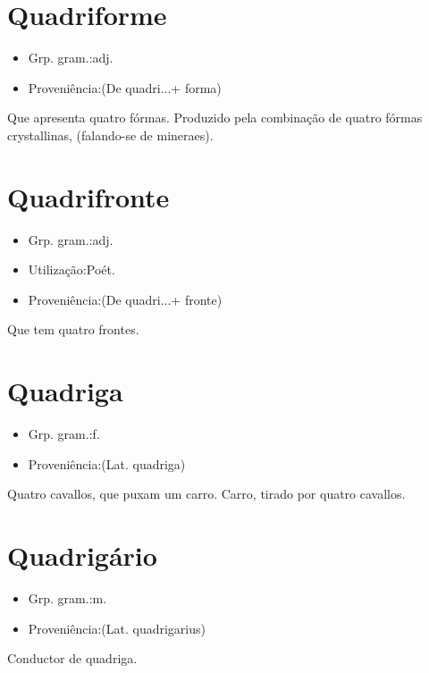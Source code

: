 \section{Quadriforme}
\begin{itemize}
\item {Grp. gram.:adj.}
\end{itemize}
\begin{itemize}
\item {Proveniência:(De \textunderscore quadri...\textunderscore  + \textunderscore forma\textunderscore )}
\end{itemize}
Que apresenta quatro fórmas.
Produzido pela combinação de quatro fórmas crystallinas, (falando-se de mineraes).
\section{Quadrifronte}
\begin{itemize}
\item {Grp. gram.:adj.}
\end{itemize}
\begin{itemize}
\item {Utilização:Poét.}
\end{itemize}
\begin{itemize}
\item {Proveniência:(De \textunderscore quadri...\textunderscore  + \textunderscore fronte\textunderscore )}
\end{itemize}
Que tem quatro frontes.
\section{Quadriga}
\begin{itemize}
\item {Grp. gram.:f.}
\end{itemize}
\begin{itemize}
\item {Proveniência:(Lat. \textunderscore quadriga\textunderscore )}
\end{itemize}
Quatro cavallos, que puxam um carro.
Carro, tirado por quatro cavallos.
\section{Quadrigário}
\begin{itemize}
\item {Grp. gram.:m.}
\end{itemize}
\begin{itemize}
\item {Proveniência:(Lat. \textunderscore quadrigarius\textunderscore )}
\end{itemize}
Conductor de quadriga.
